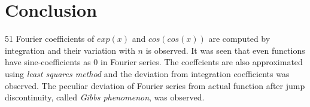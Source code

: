 \documentclass[12pt, a4paper]{article}
\begin{document}
\section{Conclusion}

51 Fourier coefficients of $exp(x)$ and $cos(cos(x))$ are computed by integration and their variation with $n$ is observed. It was seen that even functions have sine-coefficients as 0 in Fourier series. The coeffcients are also approximated using \textit{least squares method} and the deviation from integration coefficients was observed.  The peculiar deviation of Fourier series from actual function after jump discontinuity, called \textit{Gibbs phenomenon}, was observed.
\end{document}
